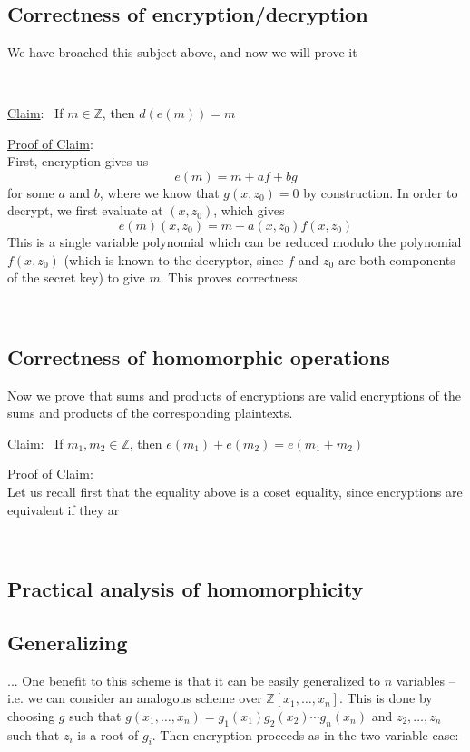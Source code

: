 \documentclass[11pt]{report}
\newcommand{\Z}{\mathbb{Z}}
\newcommand{\claim}{\underline{Claim}: \ }
\newcommand{\pf}{\underline{Proof of Claim}: \\ }
\newcommand{\Zxn}{\mathbb{Z}[x_1,\ldots,x_n]}
\begin{document}
\

\subsection{Correctness of encryption/decryption}

We have broached this subject above, and now we will prove it

\

\claim If $m\in \Z$, then $d(e(m)) = m$

\pf First, encryption gives us \[e(m) = m+af+bg\] for some $a$ and $b$, where we know that $g(x,z_0)=0$ by construction. In order to decrypt, we first evaluate at
$(x,z_0)$, which gives \[e(m)(x,z_0) = m+a(x,z_0)f(x,z_0)\] This is a single variable polynomial which can be reduced modulo the polynomial $f(x,z_0)$ (which is
known to the decryptor, since $f$ and $z_0$ are both components of the secret key) to give $m$. This proves correctness.

\

\subsection{Correctness of homomorphic operations}

Now we prove that sums and products of encryptions are valid encryptions of the sums and products of the corresponding plaintexts.

\claim If $m_1,m_2 \in \Z$, then $e(m_1)+e(m_2) = e(m_1+m_2)$

\pf Let us recall first that the equality above is a coset equality, since encryptions are equivalent if they ar 

\

\subsection{Practical analysis of homomorphicity}

\subsection{Generalizing}

... One benefit to this scheme is that it can be easily generalized to $n$ variables -- i.e. we can consider an analogous scheme over $\Zxn$. This is done by choosing $g$ such that $g(x_1,\ldots,x_n) = g_1(x_1)g_2(x_2)\cdots g_n(x_n)$ and $z_2,\ldots,z_n$ such that $z_i$ is a root of $g_i$. Then encryption proceeds as in the two-variable case:
\end{document}
